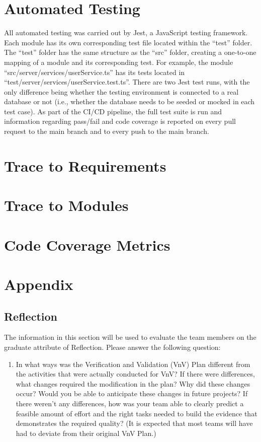 \documentclass[12pt, titlepage]{article}
\begin{document}
\section{Automated Testing}

All automated testing was carried out by Jest, a JavaScript testing framework. Each module has its
own corresponding test file located within the ``test'' folder. The ``test'' folder has the same
structure as the ``src'' folder, creating a one-to-one mapping of a module and its corresponding
test. For example, the module ``src/server/services/userService.ts'' has its tests located in
``test/server/services/userService.test.ts''. There are two Jest test runs, with the only
difference being whether the testing environment is connected to a real database or not (i.e.,
whether the database needs to be seeded or mocked in each test case). As part of the CI/CD
pipeline, the full test suite is run and information regarding pass/fail and code coverage is
reported on every pull request to the main branch and to every push to the main branch.

\section{Trace to Requirements}

\section{Trace to Modules}

\section{Code Coverage Metrics}





\newpage{}

\section{Appendix}
\subsection{Reflection}

The information in this section will be used to evaluate the team members on the graduate attribute
of Reflection. Please answer the following question:

\begin{enumerate}
	\item In what ways was the Verification and Validation (VnV) Plan different from the activities that were
	      actually conducted for VnV? If there were differences, what changes required the modification in
	      the plan? Why did these changes occur? Would you be able to anticipate these changes in future
	      projects? If there weren't any differences, how was your team able to clearly predict a feasible
	      amount of effort and the right tasks needed to build the evidence that demonstrates the required
	      quality? (It is expected that most teams will have had to deviate from their original VnV Plan.)
\end{enumerate}
\end{document}
